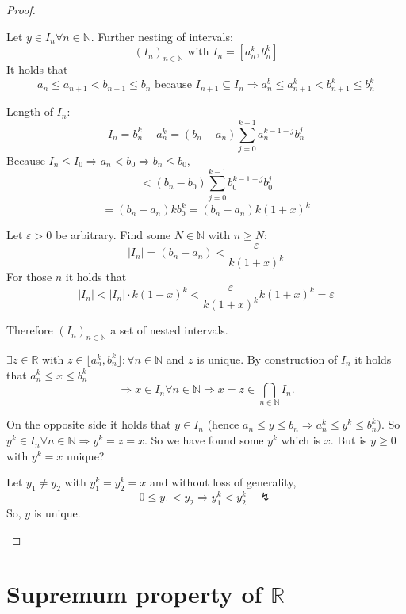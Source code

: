\documentclass[a4paper,landscape,twocolumn]{article}
\newcommand\abs[1]{\left|#1\right|}
\begin{document}
\begin{proof}
\begin{description}
      Let $y \in I_n \forall n \in \mathbb N$.
      Further nesting of intervals:
      \[ (I_n)_{n \in \mathbb N} \text{ with } I_n = [a_n^k, b_n^k] \]
      It holds that
      \[
          a_n \leq a_{n+1} < b_{n+1} \leq b_n \text{ because } I_{n+1} \subseteq I_n
          \Rightarrow a_n^b \leq a_{n+1}^k < b_{n+1}^k \leq b_n^k
      \]

      Length of $I_n$:
      \[ I_n = b_n^k - a_n^k = (b_n - a_n) \sum_{j=0}^{k-1} a_n^{k-1-j} b_n^j \]
      Because $I_n \leq I_0 \Rightarrow a_n < b_0 \Rightarrow b_n \leq b_0$,
      \[ < (b_n - b_0) \sum_{j=0}^{k-1} b_0^{k-1-j} b_0^{j} \]
      \[ = (b_n - a_n) k b_0^k = (b_n - a_n) k (1 + x)^k \]

      Let $\varepsilon > 0$ be arbitrary. Find some $N \in \mathbb N$ with $n \geq N$:
      \[ \abs{I_n} = (b_n - a_n) < \frac{\varepsilon}{k (1 + x)^k} \]
      For those $n$ it holds that
      \[ \abs{I_n} < \abs{I_n} \cdot k (1 - x)^k < \frac{\varepsilon}{k (1 + x)^k} k (1 + x)^k = \varepsilon \]

      Therefore $(I_n)_{n \in \mathbb N}$ a set of nested intervals.

      $\exists z \in \mathbb R$ with $z \in \lfloor a_n^k, b_n^k\rfloor: \forall n \in \mathbb N$
      and $z$ is unique. By construction of $I_n$ it holds that $a_n^k \leq x \leq b_n^k$
      \[ \Rightarrow x \in I_n \forall n \in \mathbb N \Rightarrow x = z \in \bigcap_{n \in \mathbb N} I_n. \]

      On the opposite side it holds that $y \in I_n$ (hence $a_n \leq y \leq b_n \Rightarrow a_n^k \leq y^k \leq b_n^k$).
      So $y^k \in I_n \forall n \in \mathbb N \Rightarrow y^k = z = x$.
      So we have found some $y^k$ which is $x$. But is $y \geq 0$ with $y^k = x$ unique?

      Let $y_1 \neq y_2$ with $y_1^k = y_2^k = x$ and without loss of generality,
      \[ 0 \leq y_1 < y_2 \Rightarrow y_1^k < y_2^k \quad\lightning \]
      So, $y$ is unique.
  \end{description}
\end{proof}

\section{Supremum property of $\mathbb R$}
\end{document}
